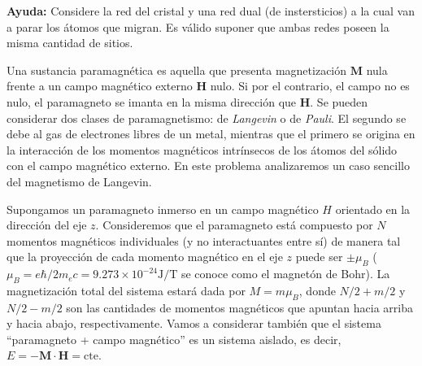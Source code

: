 \documentclass[a4paper,11pt]{article}
\newcounter{exercise}
\newcommand{\exercisetitle}[1]{
    \stepcounter{exercise}
    \vspace{1.5em}
    \noindent{
        \textbf{Problema \theexercise . #1}
        \vspace{0.5em}
    }
}
\begin{document}
\vspace{0.5em}
{\small
\textbf{Ayuda:} Considere la red del cristal y una red dual (de 
instersticios) a la cual van a parar los átomos que migran. Es válido 
suponer que ambas redes poseen la misma cantidad de sitios.
}



\exercisetitle{Paramagneto}

Una sustancia paramagnética es aquella que presenta magnetización 
$\mathbf{M}$ nula frente a un campo magnético externo $\mathbf{H}$ 
nulo.
Si por el contrario, el campo no es nulo, el paramagneto se imanta en 
la misma dirección que $\mathbf{H}$. Se pueden considerar dos clases de 
paramagnetismo: de \emph{Langevin} o de \emph{Pauli}.
El segundo se debe al gas de electrones libres de un metal, mientras 
que el primero se origina en la interacción de los momentos magnéticos 
intrínsecos de los átomos del sólido con el campo magnético externo.
En este problema analizaremos un caso sencillo del magnetismo de 
Langevin.

Supongamos un paramagneto inmerso en un campo magnético $H$ 
orientado en la dirección del eje $z$.
Consideremos que el paramagneto está compuesto por $N$ momentos 
magnéticos individuales (y no interactuantes entre sí) de manera tal 
que la proyección de cada momento magnético en el eje $z$ 
puede ser $\pm \mu_B$ ($\mu_B = e\hbar / 2m_e c = 9.273 \times 
10^{-24} \text{J/T}$ se conoce como el magnetón de Bohr).
La magnetización total del sistema estará dada por $M = m \mu_B$, donde 
$N/2 + m/2$ y $N/2 - m/2$ son las cantidades de momentos magnéticos que 
apuntan hacia arriba y hacia abajo, respectivamente.
Vamos a considerar también que el sistema ``paramagneto + campo 
magnético'' es un sistema aislado, es decir, $E = - 
\mathbf{M}\cdot\mathbf{H} = \text{cte}$.
\end{document}
